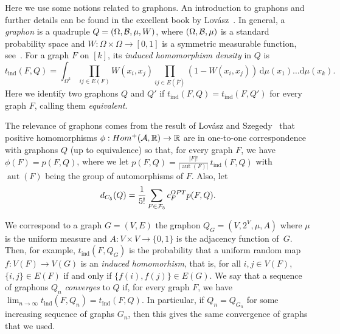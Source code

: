 \documentclass[12pt]{article}
\theoremstyle{definition}
\theoremstyle{remark}
\newcommand{\C}[1]{{\protect\mathcal{#1}}}
\renewcommand{\O}[1]{\overline{#1}}
\newcommand{\tind}{t_{\mathrm{ind}}}
\newcommand{\aut}{\operatorname{aut}}
\newcommand{\dd}{\mathrm{d}}
\newcommand{\I}[1]{{\mathbb #1}}
\begin{document}
Here we use some notions related to graphons. An introduction to graphons and further details can be found in the excellent book by Lov\'asz~\cite{Lovasz:lngl}.
In general, a \emph{graphon} is a quadruple $Q=(\Omega,\C B,\mu,W)$, where $(\Omega,\C B,\mu)$ is a standard probability space and $W:\Omega\times\Omega\to[0,1]$ is a symmetric measurable function, see~\cite[Section~13.1]{Lovasz:lngl}. For a graph $F$ on $[k]$, its \emph{induced homomorphism density} in $Q$ is 
 \begin{equation*}%
\tind(F,Q)= \int_{\Omega^k} \prod_{ij\in E(F)} W(x_i,x_j) \prod_{ij\in E(\O F)} (1-W(x_i,x_j))\,\dd \mu(x_1)\ldots\dd \mu(x_k). 
\end{equation*}
 Here we identify two graphons $Q$ and $Q'$ if $\tind(F,Q)=\tind(F,Q')$ for every graph $F$, calling them \emph{equivalent}.
 
The relevance of graphons comes from the result of Lov\'asz and Szegedy~\cite{LovaszSzegedy06} that positive homomorphisms $\phi:Hom^+(\C A,\I R)\to\I R$ are in one-to-one correspondence with graphons $Q$ (up to equivalence) so that, for every graph $F$, we have $\phi(F)=p(F,Q)$, where we let $p(F,Q)=\frac{|F|!}{|\aut(F)|}\, \tind (F,Q)$ with
$\aut(F)$ being the group of automorphisms of $F$. Also, let 
 $$
 d_{C_5}(Q)=\frac1{5!}\sum_{F\in\C F_5} c_F^{OPT} p(F,Q).
 $$

We correspond to a graph $G=(V,E)$  the graphon $Q_G=(V,2^V,\mu,A)$ where $\mu$ is the uniform measure and $A:V\times V\to \{0,1\}$ is the adjacency function of~$G$.
Then, for example, $\tind(F,Q_G)$ is the probability that a uniform random map $f:V(F)\to V(G)$ is an \emph{induced homomorhism}, that is, for all $i,j\in V(F)$, $\{i,j\}\in E(F)$ if and only if $\{f(i),f(j)\}\in E(G)$. We say that a sequence of graphons $Q_n$ \emph{converges} to $Q$ 
if, for every graph $F$, we have $\lim_{n\to\infty} \tind(F,Q_n)=\tind(F,Q)$. In particular, if $Q_n=Q_{G_n}$ for some increasing sequence of graphs $G_n$, then this gives the same convergence of graphs that we used.
\end{document}
